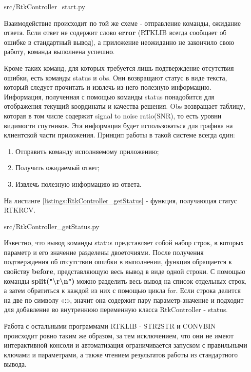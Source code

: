
{src/RtkController_start.py}

Взаимодействие происходит по той же схеме - отправление команды, ожидание ответа. Если ответ не содержит слово \textbf{error} (RTKLIB всегда сообщает об ошибке в стандартный вывод), а приложение неожиданно не закончило свою работу, команда выполнена успешно.

Кроме таких команд, для которых требуется лишь подтверждение отсутствия ошибки, есть команды status и obs. Они возвращают статус в виде текста, который следует прочитать и извлечь из него полезную информацию. Информация, полученная с помощью команды status понадобится для отображения текущий координаты и качества решения. Obs возвращает таблицу, которая в том числе содержит signal to noise ratio(SNR), то есть уровни видимости спутников. Эта информация будет использоваться для графика на клиентской части приложения. Принцип работы в такой системе всегда один:

\begin{enumerate}
  \item Отправить команду исполняемому приложению;
  \item Получить ожидаемый ответ;
  \item Извлечь полезную информацию из ответа.
\end{enumerate}

На листинге \ref{listings:RtkController_getStatus} - функция, получающая статус RTKRCV.


{src/RtkController_getStatus.py}

Известно, что вывод команды status представляет собой набор строк, в которых параметр и его значение разделены двоеточиями. После получения подтверждения об отсутствии ошибки в выполнении, функция обращается к свойству \textbf{before}, представляющую весь вывод в виде одной строки. С помощью команды \textbf{split("\textbackslash r\textbackslash n")} можно разделить весь вывод на список отдельных строк, а затем обратиться к каждой из них с помощью цикла for. Если строка делится на две по символу «\textbf{:}», значит она содержит пару параметр-значение и подходит для добавление во внутреннюю переменную класса RtkController - status.

Работа с остальными программами RTKLIB - STR2STR и CONVBIN происходит ровно таким же образом, за тем исключением, что они не имеют интерактивной консоли и автоматизация ограничивается запуском с правильными ключами и параметрами, а также чтением результатов работы из стандартного вывода.

